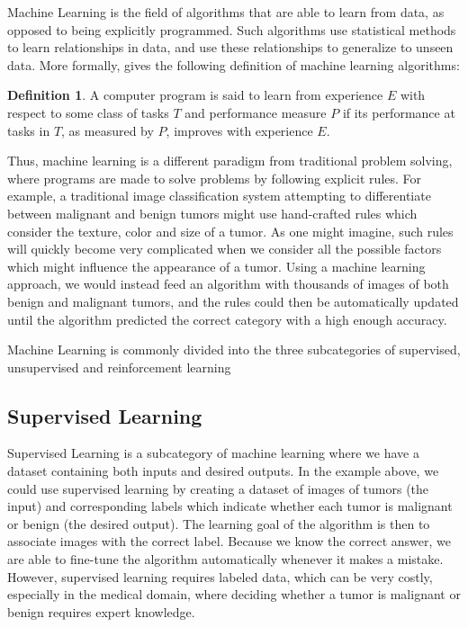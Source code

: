 \documentclass[UKenglish]{uiomasterthesis} %
\theoremstyle{definition}
\newtheorem*{definition}{Definition}
\begin{document}
Machine Learning is the field of algorithms that are able to learn from data, as opposed to being explicitly programmed. Such algorithms use statistical methods to learn relationships in data, and use these relationships to generalize to unseen data. More formally, \cite{mitchell} gives the following definition of machine learning algorithms:

\begin{definition}
A computer program is said to learn from experience $E$ with respect to some class of tasks $T$ and performance measure $P$ if its performance at tasks in $T$, as measured by $P$, improves with experience $E$.
\end{definition}

Thus, machine learning is a different paradigm from traditional problem solving, where programs are made to solve problems by following explicit rules. For example, a traditional image classification system attempting to differentiate between malignant and benign tumors might use hand-crafted rules which consider the texture, color and size of a tumor. As one might imagine, such rules will quickly become very complicated when we consider all the possible factors which might influence the appearance of a tumor. Using a machine learning approach, we would instead feed an algorithm with thousands of images of both benign and malignant tumors, and the rules could then be automatically updated until the algorithm predicted the correct category with a high enough accuracy.

Machine Learning is commonly divided into the three subcategories of supervised, unsupervised and reinforcement learning


\subsection{Supervised Learning}

Supervised Learning is a subcategory of machine learning where we have a dataset containing both inputs and desired outputs. In the example above, we could use supervised learning by creating a dataset of images of tumors (the input) and corresponding labels which indicate whether each tumor is malignant or benign (the desired output). The learning goal of the algorithm is then to associate images with the correct label. Because we know the correct answer, we are able to fine-tune the algorithm automatically whenever it makes a mistake. However, supervised learning requires labeled data, which can be very costly, especially in the medical domain, where deciding whether a tumor is malignant or benign requires expert knowledge.
\end{document}
